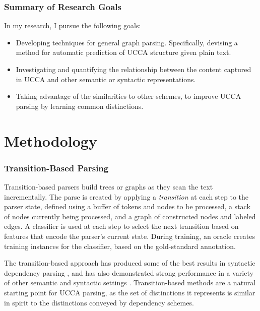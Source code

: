\documentclass[12pt]{report}
\begin{document}
\subsection*{Summary of Research Goals}

In my research, I pursue the following goals:

\begin{itemize}
  \item Developing techniques for general graph parsing.
    Specifically, devising a method for automatic prediction of UCCA
    structure given plain text.
  \item Investigating and quantifying the relationship between the content
    captured in UCCA and other semantic or syntactic representations.
  \item Taking advantage of the similarities to other schemes,
    to improve UCCA parsing by learning common distinctions.
\end{itemize}

\chapter{Methodology}

\subsection*{Transition-Based Parsing}

Transition-based parsers \citep{Nivre03anefficient} build trees or graphs
as they scan the text incrementally.
The parse is created by applying a \textit{transition} at each step to the parser state,
defined using a buffer of tokens and nodes to be processed,
a stack of nodes currently being processed,
and a graph of constructed nodes and labeled edges.
A classifier is used at each step to select the next transition based on features
that encode the parser's current state.
During training, an oracle creates training instances for the classifier,
based on the gold-standard annotation.

The transition-based approach has produced some of the best
results in syntactic dependency parsing
\citep{kiperwasser2016simple,andor2016globally}, and has also demonstrated
strong performance in a variety of other semantic and syntactic settings
\citep{maier2015discontinuous,damonte-17}.
Transition-based methods are a natural starting point for UCCA parsing,
as the set of distinctions it represents is similar in spirit to the distinctions
conveyed by dependency schemes.
\end{document}
